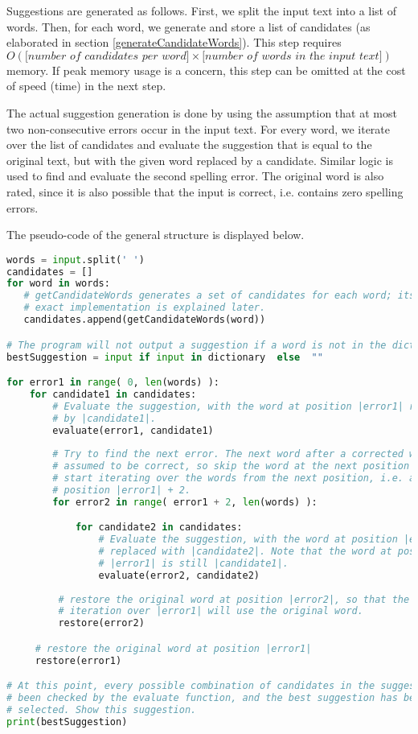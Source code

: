 \documentclass[11pt,a4paper]{article}
\begin{document}
Suggestions are generated as follows. First, we split the input text into a list of words. Then, for each word, we generate and store a list of candidates (as elaborated in section \ref{generateCandidateWords}). This step requires $O(\textit{[number of candidates per word]} \times \textit{[number of words in the input text]})$ memory. If peak memory usage is a concern, this step can be omitted at the cost of speed (time) in the next step.

The actual suggestion generation is done by using the assumption that at most two non-consecutive errors occur in the input text. For every word, we iterate over the list of candidates and evaluate the suggestion that is equal to the original text, but with the given word replaced by a candidate. Similar logic is used to find and evaluate the second spelling error. The original word is also rated, since it is also possible that the input is correct, i.e. contains zero spelling errors.

The pseudo-code of the general structure is displayed below.

\begin{lstlisting}[language=python]
words = input.split(' ')
candidates = []
for word in words:
   # getCandidateWords generates a set of candidates for each word; its
   # exact implementation is explained later.
   candidates.append(getCandidateWords(word))

# The program will not output a suggestion if a word is not in the dictionary.
bestSuggestion = input if input in dictionary  else  ""

for error1 in range( 0, len(words) ):
    for candidate1 in candidates:
        # Evaluate the suggestion, with the word at position |error1| replaced
        # by |candidate1|.
        evaluate(error1, candidate1)
      
        # Try to find the next error. The next word after a corrected word is
        # assumed to be correct, so skip the word at the next position and
        # start iterating over the words from the next position, i.e. at
        # position |error1| + 2.
        for error2 in range( error1 + 2, len(words) ):

            for candidate2 in candidates:
                # Evaluate the suggestion, with the word at position |error2|
                # replaced with |candidate2|. Note that the word at position
                # |error1| is still |candidate1|.
                evaluate(error2, candidate2)
        
         # restore the original word at position |error2|, so that the next
         # iteration over |error1| will use the original word.
         restore(error2)

     # restore the original word at position |error1|
     restore(error1)

# At this point, every possible combination of candidates in the suggestion has
# been checked by the evaluate function, and the best suggestion has been
# selected. Show this suggestion.
print(bestSuggestion)
\end{lstlisting}
\end{document}
